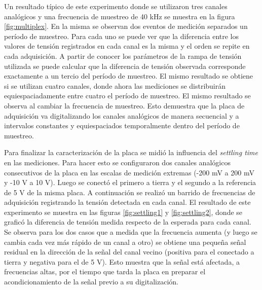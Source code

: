 \documentclass[a4paper,11pt]{article}
\begin{document}
Un resultado típico de este experimento donde se utilizaron tres canales analógicos y una frecuencia de muestreo de 40 kHz se muestra en la figura \ref{fig:multiplex}. En la misma se observan dos eventos de medición separados un período de muestreo. Para cada uno se puede ver que la diferencia entre los valores de tensión registrados en cada canal es la misma y el orden se repite en cada adquisición. A partir de conocer los parámetros de la rampa de tensión utilizada se puede calcular que la diferencia de tensión observada corresponde exactamente a un tercio del período de muestreo. El mismo resultado se obtiene si se utilizan cuatro canales, donde ahora las mediciones se distribuirán equiespaciadamente entre cuatro el período de muestreo. El mismo resultado se observa al cambiar la frecuencia de muestreo. Esto demuestra que la placa de adquisición va digitalizando los canales analógicos de manera secuencial y a intervalos constantes y equiespaciados temporalmente dentro del período de muestreo.

Para finalizar la caracterización de la placa se midió la influencia del \textit{settling time} en las mediciones. Para hacer esto se configuraron dos canales analógicos consecutivos de la placa en las escalas de medición extremas (-200 mV a 200 mV y -10 V a 10 V). Luego se conectó el primero a tierra y el segundo a la referencia de 5 V de la misma placa. A continuación se realizó un barrido de frecuencias de adquisición registrando la tensión detectada en cada canal. El resultado de este experimento se muestra en las figuras \ref{fig:settling1} y \ref{fig:settling2}, donde se graficó la diferencia de tensión medida respecto de la esperada para cada canal. Se observa para los dos casos que a medida que la frecuencia aumenta (y luego se cambia cada vez más rápido de un canal a otro) se obtiene una pequeña señal residual en la dirección de la señal del canal vecino (positiva para el conectado a tierra y negativa para el de 5 V). Esto muestra que la señal está afectada, a frecuencias altas, por el tiempo que tarda la placa en preparar el acondicionamiento de la señal previo a su digitalización.  
\end{document}
